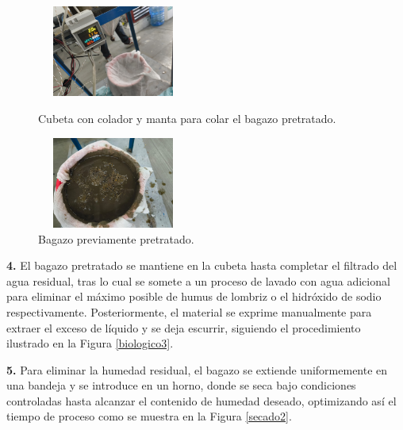 \documentclass[12pt]{article}
\begin{document}
				\begin{figure}[H]
				\centering
				\begin{minipage}{0.46\textwidth}
					\centering
					\includegraphics[width=5cm, height=3cm]{imagenes/biologico6} %
					\caption{Cubeta con colador y manta para colar el bagazo pretratado.}
					\label{Cubeta con colador y manta para colar el bagazo pretratado.}
				\end{minipage}
				\hfill
				\begin{minipage}{0.48\textwidth}
					\centering
					\includegraphics[width=5cm, height=3cm]{imagenes/bagazo_biologico_sacado} %
					\caption{Bagazo previamente pretratado.}
					\label{Bagazo1}
				\end{minipage}
			\end{figure}
	
	     \textbf{4.} El bagazo pretratado se mantiene en la cubeta hasta completar el filtrado del agua residual, tras lo cual se somete a un proceso de lavado con agua adicional para eliminar el máximo posible de humus de lombriz o el hidróxido de sodio respectivamente. Posteriormente, el material se exprime manualmente para extraer el exceso de líquido y se deja escurrir, siguiendo el procedimiento ilustrado en la Figura \ref{biologico3}.
	     
	
	\textbf{5.} Para eliminar la humedad residual, el bagazo se extiende uniformemente en una bandeja y se introduce en un horno, donde se seca bajo condiciones controladas hasta alcanzar el contenido de humedad deseado, optimizando así el tiempo de proceso como se muestra en la Figura \ref{secado2}. 
	
	
	
\end{document}
